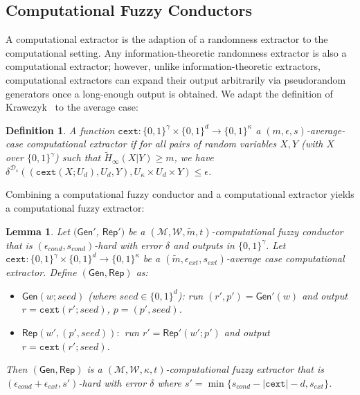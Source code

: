 \documentclass[11pt]{article}
\newcommand{\class}[1]{{\ensuremath{\mathsf{#1}}}}
\newcommand{\gen}{\ensuremath{\class{Gen}}\xspace}
\newcommand{\rep}{\ensuremath{\class{Rep}}\xspace}
\newcommand{\zo}{\ensuremath{\{0, 1\}}}
\newcommand{\cext}{\ensuremath{\mathtt{cext}}}
\newtheorem{lemma}[theorem]{Lemma}
\newtheorem{definition}[theorem]{Definition}
\begin{document}
\subsection{Computational Fuzzy Conductors}
\label{sec:further defs}
A computational extractor is the adaption of a randomness extractor to the computational setting.  Any information-theoretic randomness extractor is also a computational extractor; however, unlike information-theoretic extractors, computational extractors can expand their output arbitrarily via pseudorandom generators once a long-enough output is obtained. We adapt the definition of Krawczyk~\cite{krawczyk2010cryptographic} to the average case:
\begin{definition}
A function $\cext: \zo^\gamma \times \{0,1\}^d \rightarrow \{0,1\}^\kappa$ a \emph{$(m, \epsilon, s)$-average-case computational extractor} if for all pairs
of random variables $X, Y$ (with $X$ over $\zo^\gamma$) such that
$\tilde{H}_\infty(X|Y) \ge m$, we have $\delta^{\mathcal{D}_{s}}((\cext(X; U_d), U_d, Y), U_\kappa\times
U_d \times Y) \le \epsilon$.
\end{definition}

Combining a computational fuzzy conductor and a computational extractor yields a computational fuzzy extractor:

\begin{lemma}
\label{lem:cond and cext}
Let $(\gen'$, $\rep')$ be a $(\mathcal{M}, \mathcal{W}, \tilde{m}, t)$-computational fuzzy conductor that is $(\epsilon_{cond}, s_{cond})$-hard with error $\delta$ and outputs in $\zo^\gamma$.  Let $\cext:\zo^\gamma\times \zo^d\rightarrow \zo^\kappa$ be a $(\tilde{m}, \epsilon_{ext}, s_{ext})$-average case computational extractor.  Define $(\gen, \rep)$ as:
\begin{itemize}
\item $\gen(w; seed)$ (where $seed\in \zo^d$): run $(r', p')= \gen'(w)$ and output $r = \cext(r'; seed)$, $p = (p', seed)$. 
\item $\rep(w', (p', seed)):$ run $r' = \rep'(w'; p')$ and output $r = \cext(r'; seed)$.
\end{itemize}
Then $(\gen, \rep)$ is a $(\mathcal{M}, \mathcal{W}, \kappa, t)$-computational fuzzy extractor that is $(\epsilon_{cond}+\epsilon_{ext}, s')$-hard with error $\delta$ where $s' = \min\{s_{cond} - |\cext| -d, s_{ext}\}$.
\end{lemma}
\end{document}
